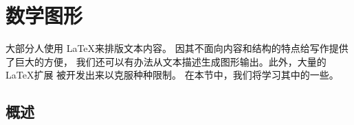 \setcounter{chapter}{4}
\newcommand{\graphicscompanion}{\emph{The \LaTeX{} Graphics Companion}~\cite{graphicscompanion}}
\newcommand{\hobby}{\emph{A User's Manual for MetaPost}~\cite{metapost}}
\newcommand{\hoenig}{\emph{\TeX{} Unbound}~\cite{unbound}}
\newcommand{\graphicsinlatex}{\emph{Graphics in \LaTeXe{}}~\cite{ursoswald}}

\chapter{数学图形}
\label{chap:graphics}

\begin{intro}
大部分人使用 \LaTeX 来排版文本内容。 因其不面向内容和结构的特点给写作提供了巨大的方便，
我们还可以有办法从文本描述生成图形输出。此外，大量的 \LaTeX 扩展
被开发出来以克服种种限制。 在本节中，我们将学习其中的一些。
\end{intro}
\section{概述}


